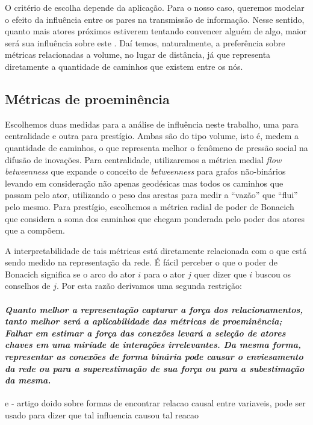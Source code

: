 \documentclass{article}
\begin{document}
O critério de escolha depende da aplicação. Para o nosso caso, queremos modelar
o efeito da influência entre os pares na transmissão de informação. Nesse
sentido, quanto mais atores próximos estiverem tentando convencer alguém de
algo, maior será sua influência sobre este \cite{Watts2007}. Daí temos,
naturalmente, a preferência sobre métricas relacionadas a volume, no lugar de distância, já que
representa diretamente a quantidade de caminhos que existem entre os nós.

\subsection{Métricas de proeminência}

Escolhemos duas medidas para a análise de influência neste trabalho, uma para
centralidade e outra para prestígio. Ambas são do tipo volume, isto é, medem a
quantidade de caminhos, o que representa melhor o fenômeno de pressão social na
difusão de inovações. Para centralidade, utilizaremos a métrica medial
\textit{flow betweenness} que expande o conceito de \textit{betweenness} para
grafos não-binários \cite{Freeman1991} levando em consideração não apenas
geodésicas mas todos os caminhos que passam pelo ator, utilizando o peso das
arestas para medir a ``vazão'' que ``flui'' pelo mesmo. Para prestígio,
escolhemos a métrica radial de poder de Bonacich \cite{Bonacich1987} que
considera a soma dos caminhos que chegam ponderada pelo poder dos atores que a
compõem.

A interpretabilidade de tais métricas está diretamente relacionada com o que está
sendo medido na representação da rede. É fácil perceber o que o poder de Bonacich
significa se o arco do ator $i$ para o ator $j$ quer dizer que $i$ buscou os
conselhos de $j$. Por esta razão derivamos uma segunda restrição:

\paragraph{\emph{Quanto melhor a representação capturar a força dos
relacionamentos, tanto melhor será a aplicabilidade das métricas de proeminência;
Falhar em estimar a força das conexões levará a seleção de atores chaves em uma
miríade de interações irrelevantes. Da mesma forma, representar as conexões de
forma binária pode causar o enviesamento da rede ou para a superestimação de sua
força ou para a subestimação da mesma.}}

\cite{Cooper1997} e \cite{Silverstein2000} - artigo doido sobre formas de
encontrar relacao causal entre variaveis, pode ser usado para dizer que tal
influencia causou tal reacao
\end{document}
